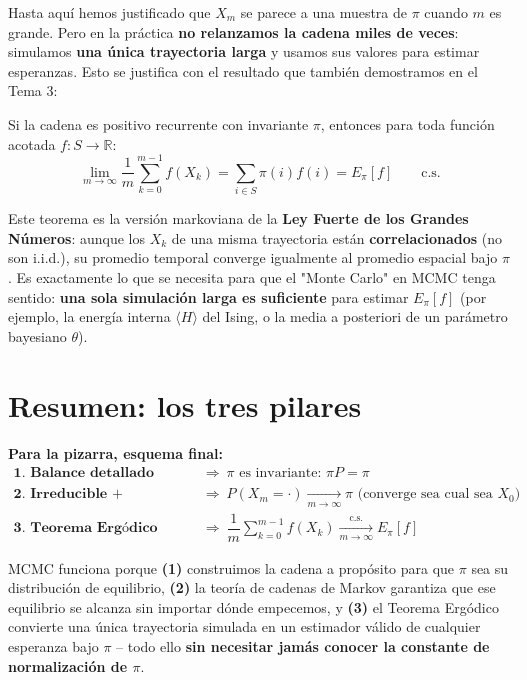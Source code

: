 \noindent
Hasta aquí hemos justificado que $X_m$ se parece a una muestra de $\pi$ cuando $m$ es grande. Pero en la práctica \textbf{no relanzamos la cadena miles de veces}: simulamos \textbf{una única trayectoria larga} y usamos sus valores para estimar esperanzas. Esto se justifica con el resultado que también demostramos en el Tema 3:

\begin{teo}
Si la cadena es positivo recurrente con invariante $\pi$, entonces para toda función acotada $f:S\to\mathbb{R}$:
\[
\lim_{m\to\infty} \frac{1}{m}\sum_{k=0}^{m-1} f(X_k) = \sum_{i\in S} \pi(i) f(i) = E_\pi[f] \qquad \text{c.s.}
\]
\end{teo}

\begin{observacion}
Este teorema es la versión markoviana de la \textbf{Ley Fuerte de los Grandes Números}: aunque los $X_k$ de una misma trayectoria están \textbf{correlacionados} (no son i.i.d.), su promedio temporal converge igualmente al promedio espacial bajo $\pi$. Es exactamente lo que se necesita para que el "Monte Carlo" en MCMC tenga sentido: \textbf{una sola simulación larga es suficiente} para estimar $E_\pi[f]$ (por ejemplo, la energía interna $\langle H\rangle$ del Ising, o la media a posteriori de un parámetro bayesiano $\theta$).
\end{observacion}

\section{Resumen: los tres pilares}

\noindent
\textbf{Para la pizarra, esquema final:}
\[
\boxed{
\begin{array}{ll}
\textbf{1. Balance detallado (diseño)} & \Longrightarrow \ \pi \text{ es invariante: } \pi P = \pi \\[4pt]
\textbf{2. Irreducible + aperiódica} & \Longrightarrow \ P(X_m=\cdot)\xrightarrow[m\to\infty]{} \pi \text{ (converge sea cual sea } X_0) \\[4pt]
\textbf{3. Teorema Ergódico} & \Longrightarrow \ \dfrac{1}{m}\sum\limits_{k=0}^{m-1} f(X_k) \xrightarrow[m\to\infty]{\text{c.s.}} E_\pi[f]
\end{array}}
\]

\begin{observacion}
MCMC funciona porque \textbf{(1)} construimos la cadena a propósito para que $\pi$ sea su distribución de equilibrio, \textbf{(2)} la teoría de cadenas de Markov garantiza que ese equilibrio se alcanza sin importar dónde empecemos, y \textbf{(3)} el Teorema Ergódico convierte una única trayectoria simulada en un estimador válido de cualquier esperanza bajo $\pi$ -- todo ello \textbf{sin necesitar jamás conocer la constante de normalización de $\pi$}.
\end{observacion}

